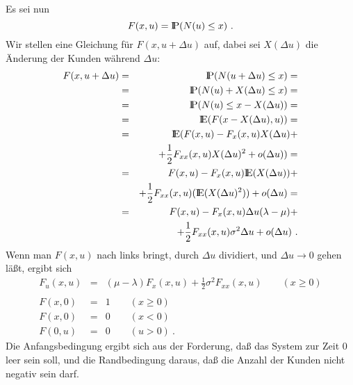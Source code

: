 \begin{enumerate}
Es sei nun
\[F(x,u) = {\rm I\kern-0.2em P}(N(u) \leq x) ~.\]
Wir stellen eine Gleichung für $F(x,u+\Delta u)$ auf, dabei sei $X(\Delta u)$ die Änderung der Kunden während $\Delta u$:
\begin{eqnarray*}
F(x,u+\Delta u)&=&{\rm I\kern-0.2em P}(N(u+\Delta u) \leq x) = \\
               &=&{\rm I\kern-0.2em P}(N(u)+X(\Delta u) \leq x) = \\
               &=&{\rm I\kern-0.2em P}(N(u) \leq x - X(\Delta u)) = \\
               &=&{\rm I\kern-0.2em E}(F(x-X(\Delta u),u)) = \\
               &=&{\rm I\kern-0.2em E}(F(x,u)-F_{x}(x,u)X(\Delta u) + \\
               & &+ \frac{1}{2}F_{xx}(x,u)X(\Delta u)^{2} + o(\Delta u)) = \\
               &=&F(x,u)-F_{x}(x,u){\rm I\kern-0.2em E}(X(\Delta u)) + \\
               & &+\frac{1}{2}F_{xx}(x,u)({\rm I\kern-0.2em E}(X(\Delta u)^{2})) + o(\Delta u) = \\
               &=&F(x,u)-F_{x}(x,u)\Delta u(\lambda-\mu) + \\
               & &+\frac{1}{2}F_{xx}(x,u)\sigma^{2}\Delta u + o(\Delta u) ~.
\end{eqnarray*}
Wenn man $F(x,u)$ nach links bringt, durch $\Delta u$ dividiert, und $\Delta u \rightarrow 0$ gehen läßt, ergibt sich
\begin{eqnarray*}
F_{u}(x,u)&=&(\mu - \lambda)F_{x}(x,u) + \frac{1}{2}\sigma^{2}F_{xx}(x,u) \qquad (x \geq 0) \\
      & & \\
F(x,0)&=&1 \qquad (x \geq 0) \\
F(x,0)&=&0 \qquad (x < 0) \\
F(0,u)&=&0 \qquad (u > 0) ~.
\end{eqnarray*}
Die Anfangsbedingung ergibt sich aus der Forderung, daß das System zur Zeit $0$ leer sein soll, und die Randbedingung daraus, daß die Anzahl der Kunden nicht
negativ sein darf.


\end{enumerate}
